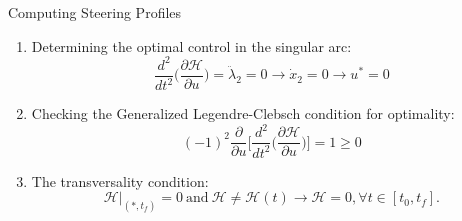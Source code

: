 \documentclass{beamer}
\newcounter{saveenumi}
\newcommand{\seti}{\setcounter{saveenumi}{\value{enumi}}}
\newcommand{\conti}{\setcounter{enumi}{\value{saveenumi}}}
\begin{document}
\begin{frame}{Computing Steering Profiles}

\begin{block}{ }
	\begin{enumerate}
		\conti
		\item Determining the optimal control in the singular arc:
		\begin{equation}
		\frac{d^2}{dt^2}\Big(\frac{\partial \mathscr{H}}{\partial u}\Big)=\ddot{\lambda}_2=0\rightarrow \dot{x}_2=0\rightarrow u^*=0
		\end{equation}
		\item Checking the Generalized Legendre-Clebsch condition for optimality:
		\begin{equation}
		(-1)^2\frac{\partial}{\partial u}\Big[\frac{d^2}{dt^2}\Big(\frac{\partial \mathscr{H}}{\partial u}\Big)\Big]=1\geq 0
		\end{equation}
		\item The transversality condition:
		\begin{equation}
		\mathscr{H}|_{(*,t_f)}=0\  \text{and} \ \mathscr{H}\neq\mathscr{H}(t)\rightarrow \mathscr{H}=0, \forall t\in[t_0, t_f].
		\end{equation}
	\end{enumerate}
	\seti
\end{block}
\end{frame}
%		
%		
\end{document}
